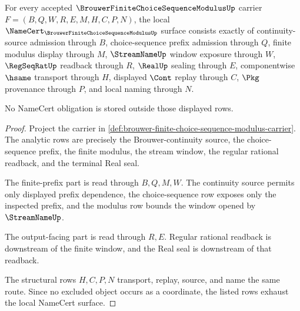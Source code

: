 \begin{theorem}
\label{thm:brouwer-finite-choice-sequence-modulus-obligations}
For every accepted $\BrouwerFiniteChoiceSequenceModulusUp$ carrier $F=(B,Q,W,R,E,M,H,C,P,N)$, the local $\NameCert_{\BrouwerFiniteChoiceSequenceModulusUp}$ surface consists exactly of continuity-source admission through $B$, choice-sequence prefix admission through $Q$, finite modulus display through $M$, $\StreamNameUp$ window exposure through $W$, $\RegSeqRatUp$ readback through $R$, $\RealUp$ sealing through $E$, componentwise $\hsame$ transport through $H$, displayed $\Cont$ replay through $C$, $\Pkg$ provenance through $P$, and local naming through $N$.

No NameCert obligation is stored outside those displayed rows.
\end{theorem}
\begin{proof}
Project the carrier in \autoref{def:brouwer-finite-choice-sequence-modulus-carrier}. The analytic rows are precisely the Brouwer-continuity source, the choice-sequence prefix, the finite modulus, the stream window, the regular rational readback, and the terminal Real seal.

The finite-prefix part is read through $B,Q,M,W$. The continuity source permits only displayed prefix dependence, the choice-sequence row exposes only the inspected prefix, and the modulus row bounds the window opened by $\StreamNameUp$.

The output-facing part is read through $R,E$. Regular rational readback is downstream of the finite window, and the Real seal is downstream of that readback.

The structural rows $H,C,P,N$ transport, replay, source, and name the same route. Since no excluded object occurs as a coordinate, the listed rows exhaust the local NameCert surface.
\end{proof}

